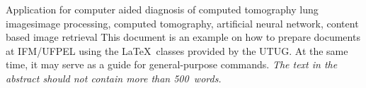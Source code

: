 \begin{abstract}
Este documento é um exemplo de como formatar documentos para o Instituto de Física e Matemática da UFPEL usando as classes \LaTeX\@. Ao mesmo tempo, pode servir de consulta para comandos mais genéricos. \emph{O texto do resumo não deve
conter mais do que 500 palavras.}
\end{abstract}

\begin{englishabstract}{Application for computer aided diagnosis of computed tomography lung images}{image processing, computed tomography, artificial neural network, content based image retrieval}
This document is an example on how to prepare documents at IFM/UFPEL using the \LaTeX\ classes provided by the UTUG\@. At the same time, it may serve as a guide for general-purpose commands. \emph{The text in
the abstract should not contain more than 500~words.}
\end{englishabstract}